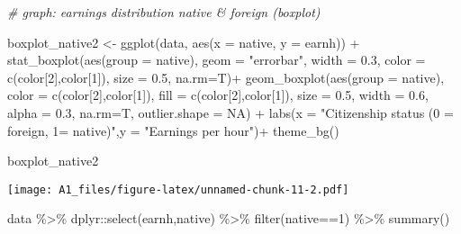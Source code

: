 \documentclass[
]{article}
\newenvironment{Shaded}{\begin{snugshade}}{\end{snugshade}}
\newcommand{\AttributeTok}[1]{\textcolor[rgb]{0.77,0.63,0.00}{#1}}
\newcommand{\CommentTok}[1]{\textcolor[rgb]{0.56,0.35,0.01}{\textit{#1}}}
\newcommand{\ConstantTok}[1]{\textcolor[rgb]{0.00,0.00,0.00}{#1}}
\newcommand{\DecValTok}[1]{\textcolor[rgb]{0.00,0.00,0.81}{#1}}
\newcommand{\FloatTok}[1]{\textcolor[rgb]{0.00,0.00,0.81}{#1}}
\newcommand{\FunctionTok}[1]{\textcolor[rgb]{0.00,0.00,0.00}{#1}}
\newcommand{\NormalTok}[1]{#1}
\newcommand{\OtherTok}[1]{\textcolor[rgb]{0.56,0.35,0.01}{#1}}
\newcommand{\SpecialCharTok}[1]{\textcolor[rgb]{0.00,0.00,0.00}{#1}}
\newcommand{\StringTok}[1]{\textcolor[rgb]{0.31,0.60,0.02}{#1}}
\begin{document}
\begin{Shaded}
\begin{Highlighting}[]
\CommentTok{\# graph: earnings distribution native \& foreign (boxplot)}

\NormalTok{boxplot\_native2 }\OtherTok{\textless{}{-}} \FunctionTok{ggplot}\NormalTok{(data, }\FunctionTok{aes}\NormalTok{(}\AttributeTok{x =}\NormalTok{ native, }\AttributeTok{y =}\NormalTok{ earnh)) }\SpecialCharTok{+}
  \FunctionTok{stat\_boxplot}\NormalTok{(}\FunctionTok{aes}\NormalTok{(}\AttributeTok{group =}\NormalTok{ native), }\AttributeTok{geom =} \StringTok{"errorbar"}\NormalTok{, }\AttributeTok{width =} \FloatTok{0.3}\NormalTok{,}
               \AttributeTok{color =} \FunctionTok{c}\NormalTok{(color[}\DecValTok{2}\NormalTok{],color[}\DecValTok{1}\NormalTok{]), }\AttributeTok{size =} \FloatTok{0.5}\NormalTok{, }\AttributeTok{na.rm=}\NormalTok{T)}\SpecialCharTok{+}
  \FunctionTok{geom\_boxplot}\NormalTok{(}\FunctionTok{aes}\NormalTok{(}\AttributeTok{group =}\NormalTok{ native),}
               \AttributeTok{color =} \FunctionTok{c}\NormalTok{(color[}\DecValTok{2}\NormalTok{],color[}\DecValTok{1}\NormalTok{]), }\AttributeTok{fill =} \FunctionTok{c}\NormalTok{(color[}\DecValTok{2}\NormalTok{],color[}\DecValTok{1}\NormalTok{]),}
               \AttributeTok{size =} \FloatTok{0.5}\NormalTok{, }\AttributeTok{width =} \FloatTok{0.6}\NormalTok{, }\AttributeTok{alpha =} \FloatTok{0.3}\NormalTok{, }\AttributeTok{na.rm=}\NormalTok{T, }\AttributeTok{outlier.shape =} \ConstantTok{NA}\NormalTok{) }\SpecialCharTok{+}
  \FunctionTok{labs}\NormalTok{(}\AttributeTok{x =} \StringTok{"Citizenship status (0 = foreign, 1= native)"}\NormalTok{,}\AttributeTok{y =} \StringTok{"Earnings per hour"}\NormalTok{)}\SpecialCharTok{+}
  \FunctionTok{theme\_bg}\NormalTok{()}

\NormalTok{boxplot\_native2}
\end{Highlighting}
\end{Shaded}

\texttt{[image: A1\_files/figure-latex/unnamed-chunk-11-2.pdf]}

\begin{Shaded}
\begin{Highlighting}[]
\NormalTok{data }\SpecialCharTok{\%\textgreater{}\%}\NormalTok{ dplyr}\SpecialCharTok{::}\FunctionTok{select}\NormalTok{(earnh,native) }\SpecialCharTok{\%\textgreater{}\%} \FunctionTok{filter}\NormalTok{(native}\SpecialCharTok{==}\DecValTok{1}\NormalTok{) }\SpecialCharTok{\%\textgreater{}\%} \FunctionTok{summary}\NormalTok{()}
\end{Highlighting}
\end{Shaded}
\end{document}
